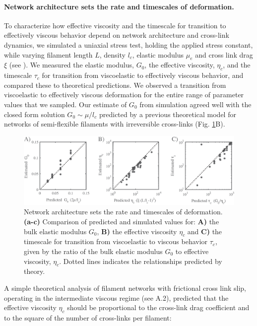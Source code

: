 \paragraph{Network architecture sets the rate and timescales of deformation.}  To characterize how effective viscosity and the timescale for transition to effectively viscous behavior depend on network architecture and cross-link dynamics, we simulated a uniaxial stress test, holding the applied stress constant, while varying filament length $L$, density $l_c$,  elastic modulus $\mu_e$ and cross link drag $\xi$ (see ). We measured the elastic modulus, $G_0$, the effective viscosity, $\eta_c$, and the timescale $\tau_c$ for transition from viscoelastic to effectively viscous behavior, and compared these to theoretical predictions. We observed a transition from viscoelastic to effectively viscous deformation for the entire range of parameter values that we sampled.  Our estimate of $G_0$ from simulation agreed well with the closed form solution  $G_0 \sim \mu/l_c$ predicted by a previous theoretical model \cite{theo_hlm} for networks of semi-flexible filaments with irreversible cross-links (Fig. \ref{fig:passive_form}B). 

\begin{figure}[H]
	\centering
	\includegraphics[width=\hsize]{active/figures/Fig3}
	\caption{\label{fig:passive_form} Network architecture sets the rate and timescales of deformation.  \textbf{(a-c)} Comparison of predicted and simulated values for: \textbf{A)} the bulk elastic modulus $G_0$,  \textbf{B)} the effective viscosity $\eta_c$ and \textbf{C)} the timescale for transition from viscoelastic to viscous behavior $\tau_c$, given by the ratio of the bulk elastic modulus $G_0$ to effective viscosity, $\eta_c$. Dotted lines indicates the relationships predicted by theory. }
\end{figure}

A simple theoretical analysis of filament networks with frictional cross link slip, operating in the intermediate viscous regime (see  A.2), predicted that the effective viscosity $\eta_c$ should be proportional to the cross-link drag coefficient and to the square of the number of cross-links per filament:

